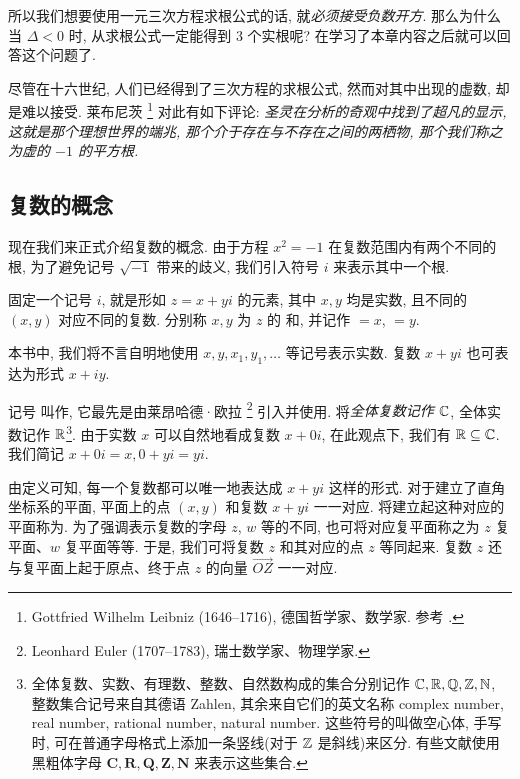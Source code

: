 所以我们想要使用一元三次方程求根公式的话, 就\emph{必须接受负数开方}.
那么为什么当 $\Delta<0$ 时, 从求根公式一定能得到 $3$ 个实根呢?
在学习了本章内容之后就可以回答这个问题了.

尽管在十六世纪, 人们已经得到了三次方程的求根公式, 然而对其中出现的虚数, 却是难以接受.
莱布尼茨%
  \footnote{%
    Gottfried Wilhelm Leibniz (1646--1716), 德国哲学家、数学家.
    参考 \cite[第13章2节]{Kline1990}.
  }%
对此有如下评论: \emph{圣灵在分析的奇观中找到了超凡的显示, 这就是那个理想世界的端兆, 那个介于存在与不存在之间的两栖物, 那个我们称之为虚的 $-1$ 的平方根.}



\subsection{复数的概念}

现在我们来正式介绍复数的概念.
由于方程 $x^2=-1$ 在复数范围内有两个不同的根, 为了避免记号 $\sqrt{-1}$ 带来的歧义, 我们引入符号 $i$ 来表示其中一个根.

\begin{definition}
  固定一个记号 $i$, 就是形如 $z=x+yi$ 的元素, 其中 $x,y$ 均是实数, 且不同的 $(x,y)$ 对应不同的复数.
  分别称 $x,y$ 为 $z$ 的 和, 并记作 ${}=x$, ${}=y$.
\end{definition}

本书中, 我们将不言自明地使用 $x,y,x_1,y_1,\dots$ 等记号表示实数.
复数 $x+yi$ 也可表达为形式 $x+iy$.

记号  叫作, 它最先是由莱昂哈德·欧拉%
  \footnote{%
    Leonhard Euler (1707--1783), 瑞士数学家、物理学家.
  }%
引入并使用.
将\emph{全体复数记作 ${\mathbb{C}}$}, 全体实数记作 ${\mathbb{R}}$\footnote{%
  全体复数、实数、有理数、整数、自然数构成的集合分别记作 ${\mathbb{C}},{\mathbb{R}},{\mathbb{Q}},{\mathbb{Z}},{\mathbb{N}}$, 整数集合记号来自其德语 Zahlen, 其余来自它们的英文名称 complex number, real number, rational number, natural number.
  这些符号的叫做空心体, 手写时, 可在普通字母格式上添加一条竖线(对于 ${\mathbb{Z}}$ 是斜线)来区分.
  有些文献使用黑粗体字母 $\mathbf{C,R,Q,Z,N}$ 来表示这些集合.
}.
由于实数 $x$ 可以自然地看成复数 $x+0i$, 在此观点下, 我们有 ${\mathbb{R}}\subseteq {\mathbb{C}}$.
我们简记 $x+0i=x,0+yi=yi$.

由定义可知, 每一个复数都可以唯一地表达成 $x+yi$ 这样的形式.
对于建立了直角坐标系的平面, 平面上的点 $(x,y)$ 和复数 $x+yi$ 一一对应.
将建立起这种对应的平面称为.
为了强调表示复数的字母 $z$, $w$ 等的不同, 也可将对应复平面称之为 $z$ 复平面、$w$ 复平面等等.
于是, 我们可将复数 $z$ 和其对应的点 $z$ 等同起来.
复数 $z$ 还与复平面上起于原点、终于点 $z$ 的向量 $\overrightarrow{OZ}$ 一一对应.

